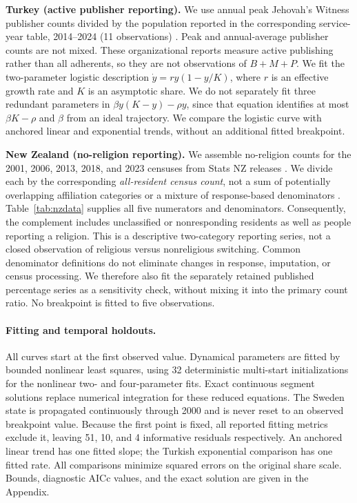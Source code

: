 \documentclass[11pt,a4paper]{article}
\begin{document}
\textbf{Turkey (active publisher reporting).}
We use annual peak Jehovah's Witness publisher counts divided by the population reported in the corresponding service-year table, 2014--2024 (11 observations) \cite{jw_service_year_report_2024,jw_country_reports_2024,jw_historical_reports,upstream_code}. Peak and annual-average publisher counts are not mixed. These organizational reports measure active publishing rather than all adherents, so they are not observations of $B+M+P$. We fit the two-parameter logistic description $\dot y=r y(1-y/K)$, where $r$ is an effective growth rate and $K$ is an asymptotic share. We do not separately fit three redundant parameters in $\beta y(K-y)-\rho y$, since that equation identifies at most $\beta K-\rho$ and $\beta$ from an ideal trajectory. We compare the logistic curve with anchored linear and exponential trends, without an additional fitted breakpoint.

\textbf{New Zealand (no-religion reporting).}
We assemble no-religion counts for the 2001, 2006, 2013, 2018, and 2023 censuses from Stats NZ releases \cite{statsnz2019religion,statsnz2024religion}. We divide each by the corresponding \emph{all-resident census count}, not a sum of potentially overlapping affiliation categories or a mixture of response-based denominators \cite{teara2001population,statsnz2013population,statsnz2018population,statsnz2024religion}. Table~\ref{tab:nzdata} supplies all five numerators and denominators. Consequently, the complement includes unclassified or nonresponding residents as well as people reporting a religion. This is a descriptive two-category reporting series, not a closed observation of religious versus nonreligious switching. Common denominator definitions do not eliminate changes in response, imputation, or census processing. We therefore also fit the separately retained published percentage series as a sensitivity check, without mixing it into the primary count ratio. No breakpoint is fitted to five observations.

\paragraph{Fitting and temporal holdouts.}
All curves start at the first observed value. Dynamical parameters are fitted by bounded nonlinear least squares, using 32 deterministic multi-start initializations for the nonlinear two- and four-parameter fits. Exact continuous segment solutions replace numerical integration for these reduced equations. The Sweden state is propagated continuously through 2000 and is never reset to an observed breakpoint value. Because the first point is fixed, all reported fitting metrics exclude it, leaving 51, 10, and 4 informative residuals respectively. An anchored linear trend has one fitted slope; the Turkish exponential comparison has one fitted rate. All comparisons minimize squared errors on the original share scale. Bounds, diagnostic AICc values, and the exact solution are given in the Appendix.
\end{document}
